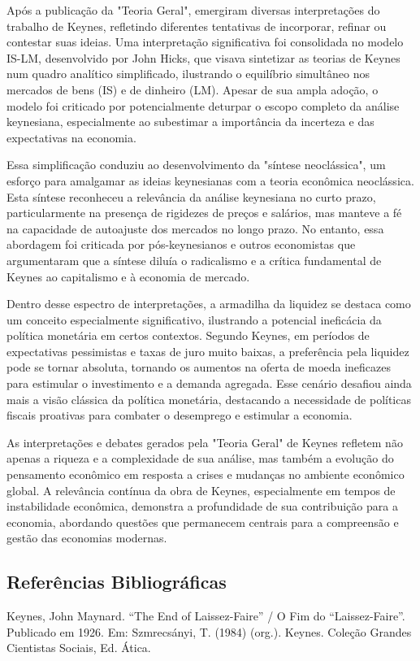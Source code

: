 \documentclass[12pt]{article}
\begin{document}
Após a publicação da "Teoria Geral", emergiram diversas interpretações do trabalho de Keynes, refletindo diferentes tentativas de incorporar, refinar ou contestar suas ideias. Uma interpretação significativa foi consolidada no modelo IS-LM, desenvolvido por John Hicks, que visava sintetizar as teorias de Keynes num quadro analítico simplificado, ilustrando o equilíbrio simultâneo nos mercados de bens (IS) e de dinheiro (LM). Apesar de sua ampla adoção, o modelo foi criticado por potencialmente deturpar o escopo completo da análise keynesiana, especialmente ao subestimar a importância da incerteza e das expectativas na economia.

Essa simplificação conduziu ao desenvolvimento da "síntese neoclássica", um esforço para amalgamar as ideias keynesianas com a teoria econômica neoclássica. Esta síntese reconheceu a relevância da análise keynesiana no curto prazo, particularmente na presença de rigidezes de preços e salários, mas manteve a fé na capacidade de autoajuste dos mercados no longo prazo. No entanto, essa abordagem foi criticada por pós-keynesianos e outros economistas que argumentaram que a síntese diluía o radicalismo e a crítica fundamental de Keynes ao capitalismo e à economia de mercado.

Dentro desse espectro de interpretações, a armadilha da liquidez se destaca como um conceito especialmente significativo, ilustrando a potencial ineficácia da política monetária em certos contextos. Segundo Keynes, em períodos de expectativas pessimistas e taxas de juro muito baixas, a preferência pela liquidez pode se tornar absoluta, tornando os aumentos na oferta de moeda ineficazes para estimular o investimento e a demanda agregada. Esse cenário desafiou ainda mais a visão clássica da política monetária, destacando a necessidade de políticas fiscais proativas para combater o desemprego e estimular a economia.

As interpretações e debates gerados pela "Teoria Geral" de Keynes refletem não apenas a riqueza e a complexidade de sua análise, mas também a evolução do pensamento econômico em resposta a crises e mudanças no ambiente econômico global. A relevância contínua da obra de Keynes, especialmente em tempos de instabilidade econômica, demonstra a profundidade de sua contribuição para a economia, abordando questões que permanecem centrais para a compreensão e gestão das economias modernas.

\subsection{\textbf{Referências Bibliográficas}}
Keynes, John Maynard. “The End of Laissez-Faire” / O Fim do “Laissez-Faire”. Publicado em
1926. Em: Szmrecsányi, T. (1984) (org.). Keynes. Coleção Grandes Cientistas Sociais, Ed.
Ática.
\end{document}
